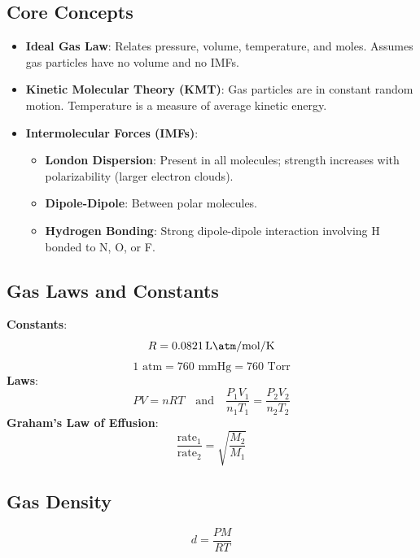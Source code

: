 \documentclass[11pt]{article}
\begin{document}
\subsection{Core Concepts}
\begin{itemize}
    \item \textbf{Ideal Gas Law}: Relates pressure, volume, temperature, and moles. Assumes gas particles have no volume and no IMFs.
    \item \textbf{Kinetic Molecular Theory (KMT)}: Gas particles are in constant random motion. Temperature is a measure of average kinetic energy.
    \item \textbf{Intermolecular Forces (IMFs)}:
        \begin{itemize}
            \item \textbf{London Dispersion}: Present in all molecules; strength increases with polarizability (larger electron clouds).
            \item \textbf{Dipole-Dipole}: Between polar molecules.
            \item \textbf{Hydrogen Bonding}: Strong dipole-dipole interaction involving H bonded to N, O, or F.
        \end{itemize}
\end{itemize}

\subsection{Gas Laws and Constants}
\begin{tcolorbox}[provided, title=Gas Laws and Constants (Provided)]
    \textbf{Constants}:
    \[ R = \SI{0.0821}{\liter\atm\per\mole\per\kelvin} \]
    \[ 1 \text{ atm} = 760 \text{ mmHg} = 760 \text{ Torr} \]
    \vspace{0.5em}
    \textbf{Laws}:
    \[ PV = nRT \quad \text{and} \quad \frac{P_1V_1}{n_1T_1} = \frac{P_2V_2}{n_2T_2} \]
    \vspace{0.5em}
    \textbf{Graham's Law of Effusion}:
    \[ \frac{\text{rate}_1}{\text{rate}_2} = \sqrt{\frac{M_2}{M_1}} \]
\end{tcolorbox}

\subsection{Gas Density}
\begin{tcolorbox}[memorize, title=Gas Density *]
    \[ d = \frac{PM}{RT} \]
\end{tcolorbox}
\end{document}
